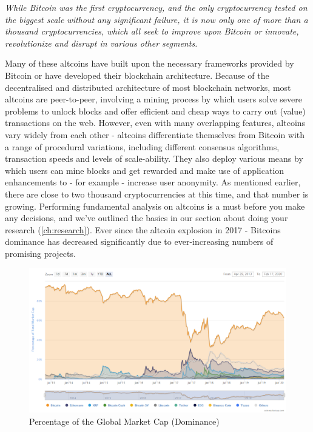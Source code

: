 \medskip
{}
    \begin{tcolorbox}
    [enhanced,
    title=Altcoins,
    frame style=
    {left color=orange!85!black,right color=yellow!95!black}]
       \textit{While Bitcoin was the first cryptocurrency, and the only cryptocurrency tested on the biggest scale without any significant failure, it is now only one of more than a thousand cryptocurrencies, which all seek to improve upon Bitcoin or innovate, revolutionize and disrupt in various other segments.}
\end{tcolorbox}
\medskip

Many of these altcoins have built upon the necessary frameworks provided by Bitcoin or have developed their blockchain architecture. Because of the decentralised and distributed architecture of most blockchain networks, most altcoins are peer-to-peer, involving a mining process by which users solve severe problems to unlock blocks and offer efficient and cheap ways to carry out (value) transactions on the web. However, even with many overlapping features, altcoins vary widely from each other - altcoins differentiate themselves from Bitcoin with a range of procedural variations, including different consensus algorithms, transaction speeds and levels of scale-ability. They also deploy various means by which users can mine blocks and get rewarded and make use of application enhancements to - for example - increase user anonymity. As mentioned earlier, there are close to two thousand cryptocurrencies at this time, and that number is growing. Performing fundamental analysis on altcoins is a must before you make any decisions, and we've outlined the basics in our section about doing your research (\cref{ch:research}). Ever since the altcoin explosion in 2017 - Bitcoins dominance has decreased significantly due to ever-increasing numbers of promising projects.

\begin{figure}
    \centering
    \includegraphics[width=\textwidth]{img/ch-iceage/cmc_domchart_feb2020.PNG}
    \caption{Percentage of the Global Market Cap (Dominance)}
    \label{fig:Total market capitalization dominance}
\end{figure} 

